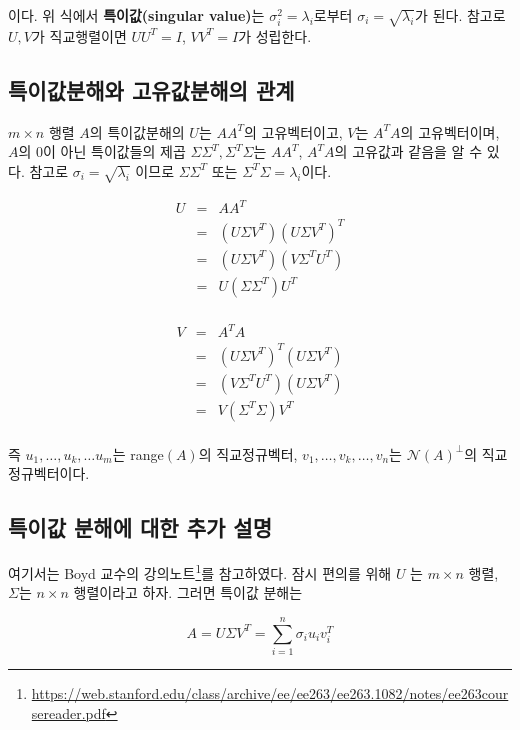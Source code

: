 \documentclass[b5paper,]{scrbook}
\theoremstyle{plain}
\theoremstyle{definition}
\numberwithin{equation}{section}
\renewcommand{\href}[2]{#2\footnote{\url{#1}}}
\begin{document}
이다. 위 식에서 \textbf{특이값(singular value)}는
\(\sigma_{i}^{2}=\lambda_{i}\)로부터 \(\sigma_{i}=\sqrt{\lambda_{i}}\)가
된다. 참고로 \(U, V\)가 직교행렬이면 \(UU^{T}=I\), \(VV^{T}=I\)가
성립한다.

\subsection{특이값분해와 고유값분해의 관계}\label{--}

\(m\times n\) 행렬 \(A\)의 특이값분해의 \(U\)는 \(AA^{T}\)의
고유벡터이고, \(V\)는 \(A^{T}A\)의 고유벡터이며, \(A\)의 0이 아닌
특이값들의 제곱 \(\Sigma\Sigma^{T}, \Sigma^{T}\Sigma\)는 \(AA^{T}\),
\(A^{T}A\)의 고유값과 같음을 알 수 있다. 참고로
\(\sigma_{i}=\sqrt{\lambda_{i}}\) 이므로 \(\Sigma\Sigma^{T}\) 또는
\(\Sigma^{T}\Sigma=\lambda_{i}\)이다.

\begin{eqnarray*}
U&=&AA^{T}\\
&=&(U\Sigma V^{T})(U\Sigma V^{T})^{T}\\
&=&(U\Sigma V^{T})(V\Sigma^{T} U^{T})\\
&=&U(\Sigma\Sigma^{T})U^{T}\\
\end{eqnarray*}

\begin{eqnarray*}
V&=&A^{T}A\\
&=&(U\Sigma V^{T})^{T}(U\Sigma V^{T})\\
&=&(V\Sigma^{T} U^{T})(U\Sigma V^{T})\\
&=&V(\Sigma^{T}\Sigma)V^{T}\\
\end{eqnarray*}

즉 \(u_{1},\ldots , u_{k}, \ldots u_{m}\)는 range\((A)\)의 직교정규벡터,
\(v_{1},\ldots ,v_{k},\ldots , v_{n}\)는 \(\mathcal{N}(A)^{\perp}\)의
직교정규벡터이다.

\subsection{특이값 분해에 대한 추가 설명}\label{----}

여기서는
\href{https://web.stanford.edu/class/archive/ee/ee263/ee263.1082/notes/ee263coursereader.pdf}{Boyd
교수의 강의노트}를 참고하였다. 잠시 편의를 위해 \(U\) 는 \(m\times n\)
행렬, \(\Sigma\)는 \(n \times n\) 행렬이라고 하자. 그러면 특이값 분해는

\[A=U\Sigma V^{T}=\sum_{i=1}^{n}\sigma_{i}u_{i}v_{i}^{T}\]
\end{document}
